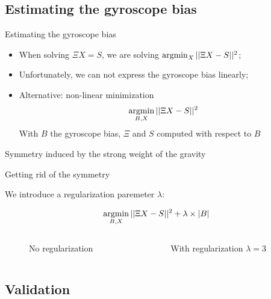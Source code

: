 \documentclass{beamer}
\newcommand{\argmin}{\operatornamewithlimits{argmin}}
\begin{document}
\subsection{Estimating the gyroscope bias}
\begin{frame}{Estimating the gyroscope bias}

  \begin{itemize}[<+->]
  \item When solving  $\Xi X = S$, we are solving $\argmin_X ||\Xi X - S||^2$;
  \item Unfortunately, we can not express the gyroscope bias linearly;
  \item Alternative: non-linear minimization
  \[
  \argmin_{B,X} ||\Xi X - S||^2
  \]
  {\small With $B$ the gyroscope bias, $\Xi$ and $S$ computed with respect to $B$}
  \end{itemize}

  \begin{figure}[h!]
        \centering
        \resizebox{0.47\textwidth}{!}{}
  \end{figure}

  Symmetry induced by the strong weight of the gravity
\end{frame}

\begin{frame}{Getting rid of the symmetry}

  We introduce a regularization paremeter $\lambda$:

  \[
  \argmin_{B,X} ||\Xi X - S||^2 + \lambda \times |B|
  \]

  \begin{columns}
    \begin{figure}[h!]
      \centering
      \resizebox{\textwidth}{!}{}
      \caption{No regularization}
    \end{figure}~

    \begin{figure}[h!]
      \centering
      \resizebox{\textwidth}{!}{}
      \caption{With regularization $\lambda =3$}
    \end{figure}
  \end{columns}

\end{frame}

\subsection{Validation}
\end{document}
